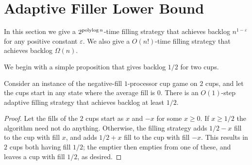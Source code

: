 \section{Adaptive Filler Lower Bound}\label{sec:adaptive}

In this section we give a $2^{\operatorname{\text{polylog}} n}$-time filling strategy
that achieves backlog $n^{1 - \varepsilon}$ for any positive
constant $\varepsilon$. 
We also give a $O(n!)$-time filling strategy that achieves
backlog $\Omega(n)$.

We begin with a simple proposition that gives backlog $1/2$ for two cups.
\begin{proposition}
  \label{prop:adaptiveBase}
  Consider an instance of the negative-fill $1$-processor cup
  game on $2$ cups, and let the cups start in any state where the
  average fill is $0$. There is an $O(1)$-step adaptive filling
  strategy that achieves backlog at least $1/2$.
\end{proposition}
\begin{proof}
  Let the fills of the $2$ cups start as $x$ and $-x$ for some $x\ge
  0$. If $x\ge 1/2$ the algorithm need not do anything. Otherwise, the filling
  strategy adds $1/2 - x$ fill to the cup with fill $x$, and adds
  $1/2 + x$ fill to the cup with fill $-x$. This results in $2$
  cups both having fill $1/2$; the emptier then empties from one
  of these, and leaves a cup with fill $1/2$, as desired.
\end{proof}

  

